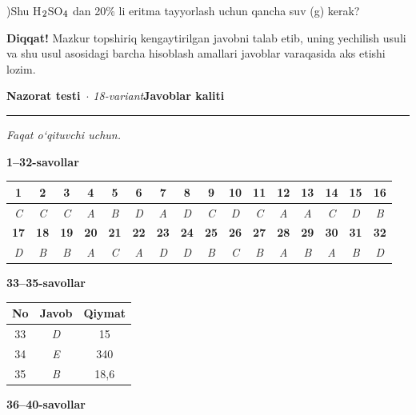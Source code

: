 \documentclass[11pt,a4paper]{article}
\renewcommand{\textsubscript}[1]{\ensuremath{_{\text{\fontsize{8}{8}\selectfont #1}}}}
\newcommand{\diqqat}[1]{\par\smallskip\noindent\textbf{Diqqat!} #1\par\medskip}
\begin{document}
)Shu H\textsubscript{2}SO\textsubscript{4} dan 20\% li eritma tayyorlash uchun qancha suv (g) kerak?\par
\diqqat{Mazkur topshiriq kengaytirilgan javobni talab etib, uning yechilish usuli va shu usul asosidagi barcha hisoblash amallari javoblar varaqasida aks etishi lozim.}
\newpage
\noindent\textbf{\fontsize{13}{15}\selectfont Nazorat testi}\ \textit{$\cdot$ 18-variant}\hfill \textbf{Javoblar kaliti}\par\smallskip\hrule\smallskip
\textit{Faqat o`qituvchi uchun.}\par\medskip
\noindent\textbf{1--32-savollar}\par\smallskip
\noindent\begin{tabular}{|c|c|c|c|c|c|c|c|c|c|c|c|c|c|c|c|}\hline
\textbf{1} & \textbf{2} & \textbf{3} & \textbf{4} & \textbf{5} & \textbf{6} & \textbf{7} & \textbf{8} & \textbf{9} & \textbf{10} & \textbf{11} & \textbf{12} & \textbf{13} & \textbf{14} & \textbf{15} & \textbf{16}\\\hline
\textsl{C} & \textsl{C} & \textsl{C} & \textsl{A} & \textsl{B} & \textsl{D} & \textsl{A} & \textsl{D} & \textsl{C} & \textsl{D} & \textsl{C} & \textsl{A} & \textsl{A} & \textsl{C} & \textsl{D} & \textsl{B}\\\hline
\textbf{17} & \textbf{18} & \textbf{19} & \textbf{20} & \textbf{21} & \textbf{22} & \textbf{23} & \textbf{24} & \textbf{25} & \textbf{26} & \textbf{27} & \textbf{28} & \textbf{29} & \textbf{30} & \textbf{31} & \textbf{32}\\\hline
\textsl{D} & \textsl{B} & \textsl{B} & \textsl{A} & \textsl{C} & \textsl{A} & \textsl{D} & \textsl{D} & \textsl{B} & \textsl{C} & \textsl{B} & \textsl{A} & \textsl{B} & \textsl{A} & \textsl{B} & \textsl{D}\\\hline
\end{tabular}\par\medskip
\noindent\textbf{33--35-savollar}\par\smallskip
\noindent\begin{tabular}{|c|c|c|}\hline \textbf{No} & \textbf{Javob} & \textbf{Qiymat}\\\hline
33 & \textsl{D} & 15\\\hline
34 & \textsl{E} & 340\\\hline
35 & \textsl{B} & 18,6\\\hline
\end{tabular}\par\medskip
\noindent\textbf{36--40-savollar}\par\smallskip
\end{document}
